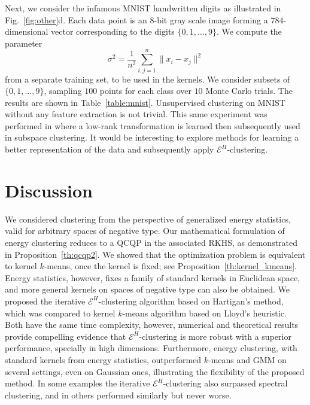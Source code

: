 \documentclass[twoside]{article}
\begin{document}
Next, we consider 
the infamous MNIST handwritten digits
as illustrated in Fig.~\ref{fig:other}d.
Each data point is an $8$-bit gray scale
image forming a $784$-dimensional vector 
corresponding to the digits $\{0,1,\dotsc,9 \}$.
We compute the parameter 
\begin{equation}
\label{eq:sigma}
\sigma^2 = \dfrac{1}{n^2} \sum_{i,j=1}^n \| x_i - x_j \|^2 
\end{equation}
from a separate
training set, to be used in the kernels.
We consider subsets of $\{0,1,\dotsc,9 \}$, 
sampling $100$ points 
for each class over $10$ Monte Carlo trials.
The results are shown in Table~\ref{table:mnist}.
Unsupervised clustering on MNIST without any feature extraction
is not trivial. This 
same experiment was performed in \citep{Sapiro} where a low-rank
transformation is learned then subsequently used in subspace clustering. 
It would be interesting to explore methods
for learning a better representation of the data and subsequently apply
$\mathcal{E}^H$-clustering.


\section{Discussion}
\label{sec:conclusion}

We considered clustering from the perspective of generalized energy
statistics, valid for arbitrary spaces of negative type.
Our mathematical formulation of energy clustering 
reduces to a QCQP in the associated RKHS, as demonstrated in 
Proposition~\ref{th:qcqp2}.
We showed that the optimization problem
is equivalent
to kernel $k$-means, once the kernel is fixed; see
Proposition~\ref{th:kernel_kmeans}. Energy statistics, however, fixes
a family of standard kernels in Euclidean space, and
more general kernels 
on spaces of negative type can also be obtained.
We proposed the iterative $\mathcal{E}^H$-clustering algorithm based on 
Hartigan's method, which was compared to kernel $k$-means algorithm
based on Lloyd's heuristic.
Both have the same time complexity, however, numerical and theoretical
results provide compelling evidence that $\mathcal{E}^H$-clustering
is more robust with a superior performance, specially in high
dimensions. 
Furthermore, energy clustering, with standard kernels from energy
statistics, outperformed $k$-means and GMM
on several settings, even on Gaussian ones, illustrating the flexibility
of the proposed method. In some
examples the iterative
$\mathcal{E}^H$-clustering also surpassed spectral clustering, and in
others performed similarly but never worse.
\end{document}
